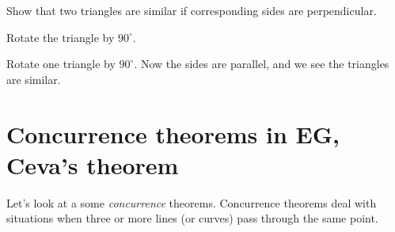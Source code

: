 \documentclass{ximera}
\begin{document}
\begin{question}
Show that two triangles are similar if corresponding sides are perpendicular.
\begin{solution}
\begin{hint}
Rotate the triangle by $90^\circ$.
\end{hint}
Rotate one triangle by $90^\circ$. Now the sides are parallel, and we
see the triangles are similar.
\end{solution}
\end{question}


\section*{Concurrence theorems in \textbf{EG}, Ceva's theorem}

Let's look at a some \textit{concurrence} theorems. Concurrence
theorems deal with situations when three or more lines (or curves)
pass through the same point.
\end{document}
